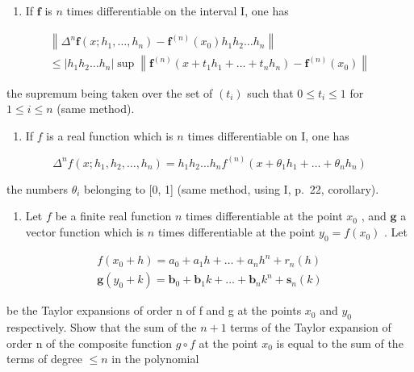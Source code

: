 \begin{enumerate}
\def\labelenumi{\alph{enumi})}
\setcounter{enumi}{1}
\tightlist
\item
  If \(\mathbf{f}\) is \(n\) times differentiable on the interval I, one has
\end{enumerate}

\[
\begin{array}{l} \left\| \Delta^ {n} \mathbf {f} (x; h _ {1}, \ldots , h _ {n}) - \mathbf {f} ^ {(n)} (x _ {0}) h _ {1} h _ {2} \ldots h _ {n} \right\| \\ \leqslant | h _ {1} h _ {2} \ldots h _ {n} | \sup \left\| \mathbf {f} ^ {(n)} (x + t _ {1} h _ {1} + \dots + t _ {n} h _ {n}) - \mathbf {f} ^ {(n)} (x _ {0}) \right\| \end{array}
\]

the supremum being taken over the set of \((t_i)\) such that \(0 \leqslant t_i \leqslant 1\) for \(1 \leqslant i \leqslant n\) (same method).

\begin{enumerate}
\def\labelenumi{\alph{enumi})}
\setcounter{enumi}{2}
\tightlist
\item
  If \(f\) is a real function which is \(n\) times differentiable on I, one has
\end{enumerate}

\[
\Delta^ {n} f (x; h _ {1}, h _ {2}, \dots , h _ {n}) = h _ {1} h _ {2} \dots h _ {n} f ^ {(n)} (x + \theta_ {1} h _ {1} + \dots + \theta_ {n} h _ {n})
\]

the numbers \(\theta_{i}\) belonging to {[}0, 1{]} (same method, using I, p.~22, corollary).

\begin{enumerate}
\def\labelenumi{\arabic{enumi})}
\setcounter{enumi}{6}
\tightlist
\item
  Let \(f\) be a finite real function \(n\) times differentiable at the point \(x_0\) , and \(\mathbf{g}\) a vector function which is \(n\) times differentiable at the point \(y_0 = f(x_0)\) . Let
\end{enumerate}

\[
\begin{array}{l} f (x _ {0} + h) = a _ {0} + a _ {1} h + \dots + a _ {n} h ^ {n} + r _ {n} (h) \\ \mathbf {g} (y _ {0} + k) = \mathbf {b} _ {0} + \mathbf {b} _ {1} k + \dots + \mathbf {b} _ {n} k ^ {n} + \mathbf {s} _ {n} (k) \end{array}
\]

be the Taylor expansions of order n of f and g at the points \(x_{0}\) and \(y_{0}\) respectively. Show that the sum of the \(n+1\) terms of the Taylor expansion of order n of the composite function \(g \circ f\) at the point \(x_{0}\) is equal to the sum of the terms of degree \(\leqslant n\) in the polynomial

